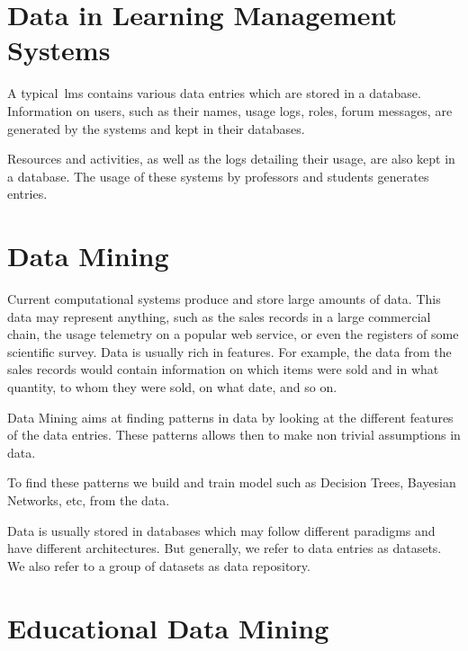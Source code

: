 \section{Data in Learning Management Systems}

A typical~\gls{lms} contains various data entries which are stored in a
database. Information on users, such as their names, usage logs, roles, forum
messages, are generated by the systems and kept in their databases.

Resources and activities, as well as the logs detailing their usage, are also
kept in a database. The usage of these systems by professors and students
generates entries.

\section{Data Mining}

Current computational systems produce and store large amounts of data. This
data may represent anything, such as the sales records in a large commercial
chain, the usage telemetry on a popular web service, or even the registers of
some scientific survey. Data is usually rich in features. For example, the data
from the sales records would contain information on which items were sold and
in what quantity, to whom they were sold, on what date, and so on.

Data Mining aims at finding patterns in data by looking at the different
features of the data entries. These patterns allows then to make non trivial
assumptions in data.~\cite{book_dm_practical}

To find these patterns we build and train model such as Decision Trees,
Bayesian Networks, etc, from the data.

Data is usually stored in databases which may follow different paradigms and
have different architectures. But generally, we refer to data entries as
datasets. We also refer to a group of datasets as data repository.


\section{Educational Data Mining}

